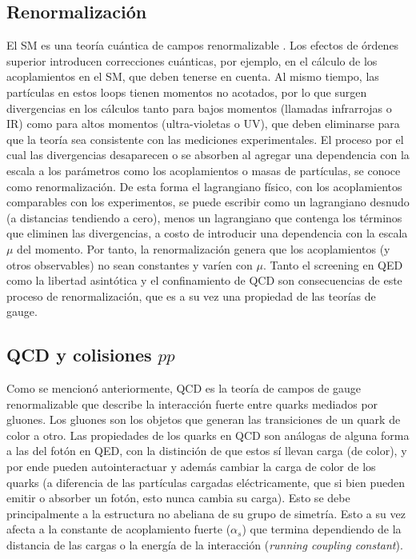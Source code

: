 \subsection{Renormalización}


El SM es una teoría cuántica de campos renormalizable \cite{tesis_joaco}. Los efectos de órdenes superior
introducen correcciones cuánticas, por ejemplo, en el cálculo de los acoplamientos
en el SM, que deben tenerse en cuenta. Al mismo tiempo, las partículas en estos
loops tienen momentos no acotados, por lo que surgen divergencias en los cálculos
tanto para bajos momentos (llamadas infrarrojas o IR) como para altos momentos
(ultra-violetas o UV), que deben eliminarse para que la teoría sea consistente con
las mediciones experimentales. El proceso por el cual las divergencias desaparecen
o se absorben al agregar una dependencia con la escala a los parámetros como
los acoplamientos o masas de partículas, se conoce como renormalización. De esta
forma el lagrangiano físico, con los acoplamientos comparables con los experimentos,
se puede escribir como un lagrangiano desnudo (a distancias tendiendo a cero), menos un lagrangiano que contenga los términos que eliminen las divergencias,
a costo de introducir una dependencia con la escala $\mu$ del momento. Por tanto, la
renormalización genera que los acoplamientos (y otros observables) no sean constantes y varíen con $\mu$. Tanto el screening en QED como la libertad asintótica y el
confinamiento de QCD son consecuencias de este proceso de renormalización, que
es a su vez una propiedad de las teorías de gauge.


\subsection{QCD y colisiones $pp$}\label{sec:qcd_pp}

Como se mencionó anteriormente, QCD \cite{qcd_collider, tesis_martin} es la teoría de campos de gauge renormalizable
que describe la interacción fuerte entre quarks mediados por gluones. Los gluones son los objetos que generan las transiciones de un quark de color a otro. Las propiedades de los quarks en QCD son análogas de alguna forma a las del fotón en QED, con la distinción de que estos sí llevan carga (de color), y por ende pueden autointeractuar y además cambiar la carga  de color de los quarks (a diferencia de las partículas cargadas eléctricamente, que si bien pueden emitir o absorber un fotón, esto nunca cambia su carga). Esto se debe principalmente a la estructura no abeliana de su grupo de simetría.
Esto a su vez afecta a la constante de acoplamiento fuerte ($\alpha_s$) que termina dependiendo de la distancia de las cargas o la energía de la interacción (\textit{running coupling constant}). 

